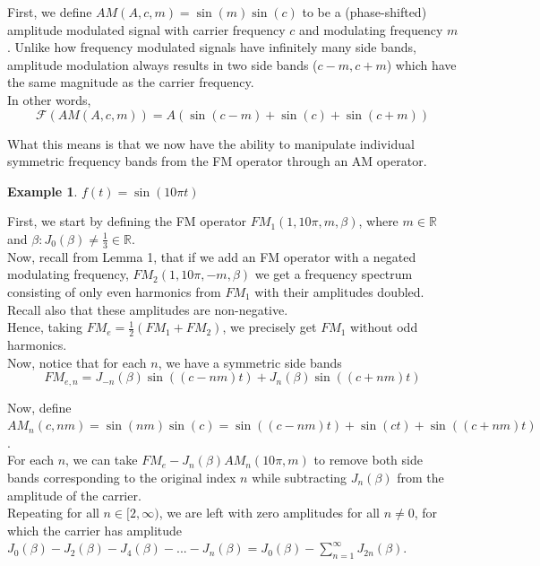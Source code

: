 \documentclass[11pt,twoside]{report}
\newtheorem{example}[thm]{Example}
\numberwithin{thm}{section}
\numberwithin{equation}{section}
\begin{document}
First, we define $AM(A, c, m) = \sin(m)\sin(c)$ to be a (phase-shifted) amplitude modulated signal with carrier frequency $c$ and modulating frequency $m$. Unlike how frequency modulated signals have infinitely many side bands, amplitude modulation always results in two side bands ($c-m, c+m$) which have the same magnitude as the carrier frequency. \\

In other words, 
$$\mathcal{F}(AM(A, c, m)) = A(\sin(c - m) + \sin(c) + \sin(c + m))$$

What this means is that we now have the ability to manipulate individual symmetric frequency bands from the FM operator through an AM operator. 

\begin{example} $f(t) = \sin(10\pi t)$
\end{example}

First, we start by defining the FM operator $FM_1(1,10\pi, m, \beta)$, where $m \in \mathbb{R}$ and $\beta : J_0(\beta) \neq \frac{1}{3} \in \mathbb{R}$.\\

Now, recall from Lemma 1, that if we add an FM operator with a negated modulating frequency, $FM_2(1, 10\pi, -m, \beta)$ we get a frequency spectrum consisting of only even harmonics from $FM_1$ with their amplitudes doubled. Recall also that these amplitudes are non-negative. \\

Hence, taking $FM_e = \frac{1}{2}(FM_1 + FM_2)$, we precisely get $FM_1$ without odd harmonics.\\

Now, notice that for each $n$, we have a symmetric side bands $$FM_{e,n} = J_{-n}(\beta)\sin((c - nm)t) + J_{n}(\beta)\sin((c+nm)t)$$

Now, define $AM_n(c, nm) = \sin(nm)\sin(c) = \sin((c - nm)t) + \sin(ct) + \sin((c+nm)t)$.\\

For each $n$, we can take $FM_e - J_n(\beta)AM_n(10\pi, m)$ to remove both side bands corresponding to the original index $n$ while subtracting $J_n(\beta)$ from the amplitude of the carrier. \\

Repeating for all $n \in [2, \infty) $, we are left with zero amplitudes for all $n \neq 0$, for which the carrier has amplitude $J_0(\beta) - J_2(\beta) - J_4(\beta) - ... - J_n(\beta) = J_0(\beta) - \sum_{n=1}^\infty J_{2n}(\beta)$.\\
\end{document}
